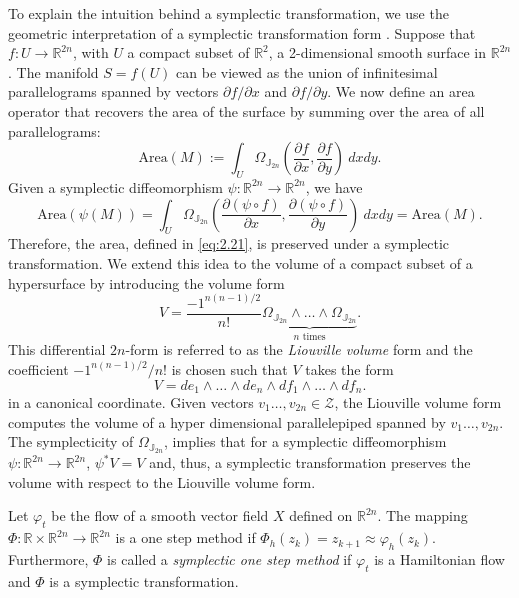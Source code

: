 To explain the intuition behind a symplectic transformation, we use the geometric interpretation of a symplectic transformation form \cite{hairer2006geometric}. Suppose that $f:U \to \mathbb R^{2n}$, with $U$ a compact subset of $\mathbb R^{2}$, a 2-dimensional smooth surface in $\mathbb R^{2n}$. The manifold $S = f(U)$ can be viewed as the union of infinitesimal parallelograms spanned by vectors ${\partial f}/{\partial x}$ and ${\partial f}/{\partial y}$. We now define an area operator that recovers the area of the surface by summing over the area of all parallelograms:
\begin{equation} \label{eq:2.21}
	\text{Area}(M) := \int_U \Omega_{\mathbb J_{2n}}( \frac{\partial f}{\partial x} , \frac{\partial f}{\partial y} ) \ dx dy.
\end{equation}
Given a symplectic diffeomorphism $\psi:\mathbb R^{2n} \to \mathbb R^{2n}$, we have
\begin{equation*}
	\text{Area}(\psi(M)) = \int_U \Omega_{\mathbb J_{2n}}( \frac{\partial (\psi \circ f) }{\partial x} , \frac{\partial (\psi \circ f)}{\partial y} ) \ dx dy = \text{Area}(M).
\end{equation*}
Therefore, the area, defined in \eqref{eq:2.21}, is preserved under a symplectic transformation. We extend this idea to the volume of a compact subset of a hypersurface by introducing the volume form
\begin{equation*}
	V = \frac{-1^{n(n-1)/2}}{n!} \underbrace{\Omega_{\mathbb J_{2n}} \wedge \dots \wedge \Omega_{\mathbb J_{2n}}}_{n \text{ times}}.
\end{equation*}
This differential $2n$-form is referred to as the  \emph{Liouville volume} \cite{marsden2013introduction} form and the coefficient ${-1^{n(n-1)/2}}/{n!}$ is chosen such that $V$ takes the form
\begin{equation}\label{eq:2.22}
	V = de_1 \wedge \dots \wedge de_n \wedge df_1 \wedge \dots \wedge df_n. 
\end{equation}
in a canonical coordinate. Given vectors $v_1\dots,v_{2n}\in \mathcal Z$, the Liouville volume form computes the volume of a hyper dimensional parallelepiped spanned by $v_1\dots,v_{2n}$. The symplecticity of $\Omega_{\mathbb J_{2n}}$, implies that for a symplectic diffeomorphism $\psi:\mathbb R^{2n} \to \mathbb{R}^{2n}$, $\psi^*V = V$ and, thus, a symplectic transformation preserves the volume with respect to the Liouville volume form.

\begin{definition}
Let $\varphi_t$ be the flow of a smooth vector field $X$ defined on $\mathbb R^{2n}$. The mapping $\Phi:\mathbb R \times \mathbb R^{2n} \to \mathbb R^{2n}$ is a one step method if $\Phi_h (z_k) = z_{k+1} \approx \varphi_h(z_k)$. Furthermore, $\Phi$ is called a \emph{symplectic one step method} if $\varphi_t$ is a Hamiltonian flow and $\Phi$ is a symplectic transformation.
\end{definition}

